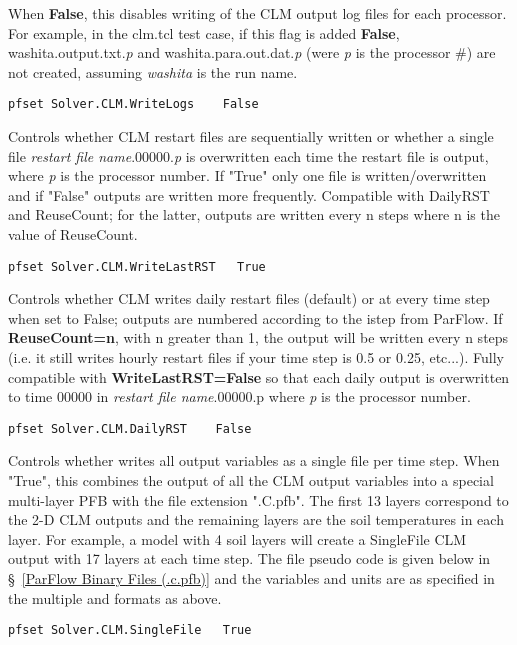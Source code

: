 {When {\bf False}, this disables writing of the CLM output log files for each processor.
For example, in the clm.tcl test case, if this flag is added {\bf False},
washita.output.txt.\emph{p} and washita.para.out.dat.\emph{p} (were \emph{p} is the processor \#)
are not created, assuming \emph{washita} is the run name.}
\begin{display}\begin{verbatim}
pfset Solver.CLM.WriteLogs    False
\end{verbatim}\end{display}

{Controls whether CLM restart files are sequentially written or whether a single
file \emph{restart file name}.00000.\emph{p} is overwritten each time the restart file is output,
where \emph{p} is the processor number. If "True" only one file is written/overwritten and if
"False" outputs are written more frequently. Compatible with DailyRST and ReuseCount;
for the latter, outputs are written every n steps where n is the value of ReuseCount.}
\begin{display}\begin{verbatim}
pfset Solver.CLM.WriteLastRST   True
\end{verbatim}\end{display}

{Controls whether CLM writes daily restart files (default) or at every time step when set
to False; outputs are numbered according to the istep from ParFlow. If {\bf ReuseCount=n},
with n greater than 1, the output will be written every n steps (i.e. it still writes hourly
restart files if your time step is 0.5 or 0.25, etc...). Fully compatible with {\bf WriteLastRST=False}
so that each daily output is overwritten to time 00000 in \emph{restart file name}.00000.p
where \emph{p} is the processor number.}
\begin{display}\begin{verbatim}
pfset Solver.CLM.DailyRST    False
\end{verbatim}\end{display}

{Controls whether \parflow{} writes all  output variables as a single file per time step.
When "True", this combines the output of all the CLM output variables into a special multi-layer
PFB with the file extension ".C.pfb". The first 13 layers correspond to the 2-D CLM
outputs and the remaining layers are the soil temperatures in each layer. For example,
a model with 4 soil layers will create a SingleFile CLM output with 17 layers at each time step. The
file pseudo code is given below in \S~\ref{ParFlow Binary Files (.c.pfb)} and the variables and units
are as specified in the multiple  and  formats as above.}
\begin{display}\begin{verbatim}
pfset Solver.CLM.SingleFile   True
\end{verbatim}\end{display}

